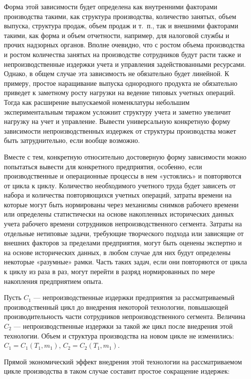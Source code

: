 \documentclass{article}
\begin{document}
Форма этой зависимости будет определена как внутренними факторами производства такими, как структура производства, количество занятых, объем выпуска, структура продаж, объем продаж и т.~п., так и внешними факторами такими, как форма и объем отчетности, например, для налоговой службы и прочих надзорных органов. Вполне очевидно, что с ростом объема производства и ростом количества занятых на производстве сотрудников будут расти также и непроизводственные издержки учета и управления задействованными ресурсами. Однако, в общем случае эта зависимость не обязательно будет линейной. К примеру, простое наращивание выпуска однородного продукта не обязательно приведет к заметному росту нагрузки на ведение типовых учетных операций. Тогда как расширение выпускаемой номенклатуры небольшим экспериментальным тиражом усложнит структуру учета и заметно увеличит нагрузку на учет и управление. Вывести универсальную конкретную форму зависимости непроизводственных издержек от структуры производства может быть затруднительно, если вообще возможно.

Вместе с тем, конкретную относительно достоверную форму зависимости можно попытаться вывести для конкретного предприятия, особенно, если производственные и операционные процессы в нем «устоялись» и повторяются от цикла к циклу. Количество необходимого учетного труда будет зависеть от набора и количества повторяющихся учетных операций, затраты времени на которые могут быть нормированы через механизмы снимков рабочего времени или определены статистически на основе накопленных исторических данных учета рабочего времени сотрудников непроизводственного сегмента. Затраты на отдельные нетиповые задачи, требующие творческого подхода или зависящие от внешних факторов за пределами предприятия, могут быть оценены экспертно и на основе исторических данных, в любом случае для них будут определены некоторые «разумные» рамки. Часть таких задач, если они повторяются от цикла к циклу из раза в раз, могут перейти в разряд нормированных по мере накопления предприятием опыта.

Пусть $C_1$ — непроизводственные издержки предприятия за рассматриваемый производственный цикл до внедрения некоторой технологии, повышающей производительность части сотрудников непроизводственного сегмента. Величина $C_2$ — непроизводственные издержки за такой же цикл после внедрения этой технологии. Объем и структура производства на новом цикле не изменились: $C_1 = C_1(T_1, m_1)$, $C_2 = C_2(T_1, m_1)$.

Прямой экономический эффект внедрения этой технологии на рассматриваемом цикле производства в таком случае составит простое сокращение издержек:
\end{document}
